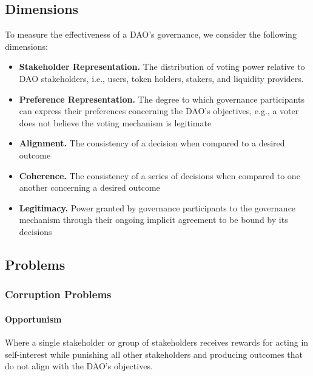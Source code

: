 \documentclass[
]{article}
\providecommand{\tightlist}{%
  \setlength{\itemsep}{0pt}\setlength{\parskip}{0pt}}
\begin{document}
\hypertarget{dimensions}{%
\subsection{Dimensions}\label{dimensions}}

To measure the effectiveness of a DAO's governance, we consider the
following dimensions:

\begin{itemize}
\tightlist
\item
  \textbf{Stakeholder Representation.} The distribution of voting power
  relative to DAO stakeholders, i.e., users, token holders, stakers, and
  liquidity providers.
\item
  \textbf{Preference Representation.} The degree to which governance
  participants can express their preferences concerning the DAO's
  objectives, e.g., a voter does not believe the voting mechanism is
  legitimate
\item
  \textbf{Alignment.} The consistency of a decision when compared to a
  desired outcome
\item
  \textbf{Coherence.} The consistency of a series of decisions when
  compared to one another concerning a desired outcome
\item
  \textbf{Legitimacy.} Power granted by governance participants to the
  governance mechanism through their ongoing implicit agreement to be
  bound by its decisions
\end{itemize}

\hypertarget{problems-1}{%
\subsection{Problems}\label{problems-1}}

\hypertarget{corruption-problems}{%
\subsubsection{Corruption Problems}\label{corruption-problems}}

\hypertarget{opportunism}{%
\paragraph{Opportunism}\label{opportunism}}

Where a single stakeholder or group of stakeholders receives rewards for
acting in self-interest while punishing all other stakeholders and
producing outcomes that do not align with the DAO's objectives.
\end{document}
